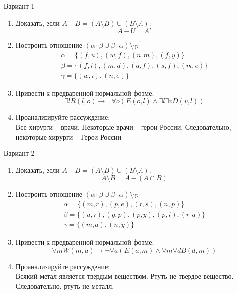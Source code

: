 \documentclass[10pt,a4paper]{article}
\begin{document}
\pagebreak

\begin{multicols}{2}

Вариант 1
\begin{enumerate}
\item Доказать, если $A\,\dot{-}\,B=(A\setminus B)\cup(B\setminus A)$: \\
$$A\,\dot{-}\,U=A'$$
\item Построить отношение $(\alpha\cdot\beta\cup\beta\cdot\alpha)\setminus\gamma$:
$$\begin{array}{l} \alpha=\{ (f, u), (w, f), (n, m), (f, y) \} \\ \beta=\{ (f, i), (m, d), (a, f), (s, f), (m, e) \} \\ \gamma=\{ (w, i), (n, e) \} \end{array}$$
\item Привести к предваренной нормальной форме: \:\\
$$\exists lR(l,o) \to \neg \forall o( E(o,l) \wedge \exists l\exists v D(v, l))$$
\item Проанализируйте рассуждение: \:\\
Все хирурги -- врачи. Некоторые врачи -- герои России. Следовательно, некоторые хирурги -- Герои России
\end{enumerate}
Вариант 2
\begin{enumerate}
\item Доказать, если $A\,\dot{-}\,B=(A\setminus B)\cup(B\setminus A)$: \\
$$A\setminus B = A\,\dot{-}\,(A\cap B)$$
\item Построить отношение $(\alpha\cdot\beta\cup\beta\cdot\alpha)\setminus\gamma$:
$$\begin{array}{l} \alpha=\{ (m, r), (p, e), (r, s), (n, p) \} \\ \beta=\{ (u, r), (g, p), (p, y), (p, i), (r, a) \} \\ \gamma=\{ (m, a), (n, y) \} \end{array}$$
\item Привести к предваренной нормальной форме: \:\\
$$\forall mW(m,a) \to \neg \forall a( E(a,m) \wedge \forall m\forall d B(d, m))$$
\item Проанализируйте рассуждение: \:\\
Всякий метал является твердым веществом. Ртуть не твердое вещество. Следовательно, ртуть не металл.
\end{enumerate}

\vfill\columnbreak


\end{multicols}
\end{document}
